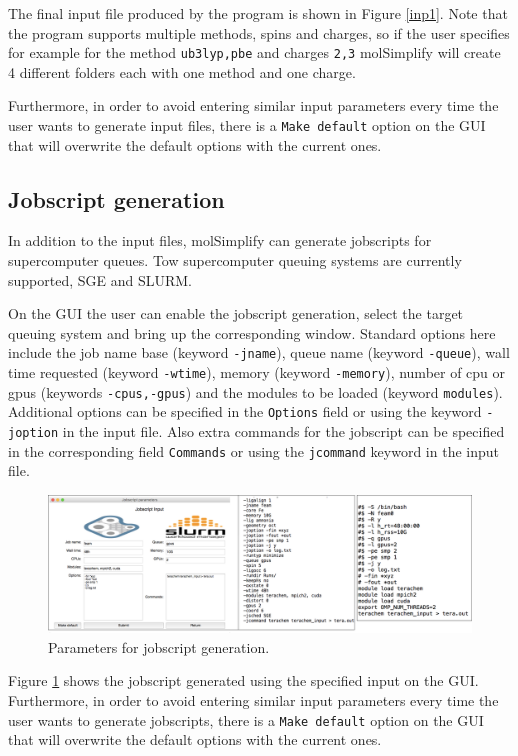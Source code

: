 \documentclass[a4paper,12pt]{assignment}
\begin{document}
The final input file produced by the program is shown in Figure \ref{inp1}. Note that the program supports multiple methods, spins and charges, so if the user specifies for example for the method \texttt{ub3lyp,pbe} and charges \texttt{2,3} molSimplify will create 4 different folders each with one method and one charge.

Furthermore, in order to avoid entering similar input parameters every time the user wants to generate input files, there is a \texttt{Make default} option on the GUI that will overwrite the default options with the current ones.


\subsection{Jobscript generation}

In addition to the input files, molSimplify can generate jobscripts for supercomputer queues. Tow supercomputer queuing systems are currently supported, SGE and SLURM. 

On the GUI the user can enable the jobscript generation, select the target queuing system and bring up the corresponding window. Standard options here include the job name base (keyword \texttt{-jname}), queue name  (keyword \texttt{-queue}), wall time requested  (keyword \texttt{-wtime}), memory  (keyword \texttt{-memory}), number of cpu or gpus  (keywords \texttt{-cpus,-gpus}) and the modules to be loaded  (keyword \texttt{modules}). Additional options can be specified in the \texttt{Options} field or using the keyword \texttt{-joption} in the input file. Also extra commands for the jobscript can be specified in the corresponding field \texttt{Commands} or using the \texttt{jcommand} keyword in the input file.

\begin{figure}[htb!]
\centering
\includegraphics[width=\textwidth]{./Figures/fig11.png}
\caption{Parameters for jobscript generation.}
\label{job1}
\end{figure}

Figure \ref{job1} shows the jobscript generated using the specified input on the GUI. Furthermore, in order to avoid entering similar input parameters every time the user wants to generate jobscripts, there is a \texttt{Make default} option on the GUI that will overwrite the default options with the current ones.
\end{document}
